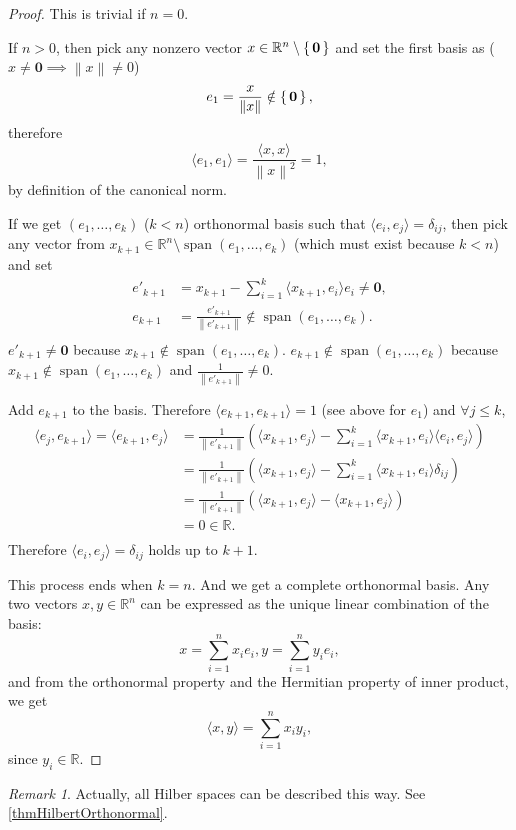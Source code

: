 \documentclass[12pt, letterpaper]{article}
\newcommand{\re}{\mathbb{R}}
\newcommand{\norm}[1]{\left\lVert #1 \right\rVert}
\theoremstyle{definition}
\theoremstyle{remark}
\newtheorem*{rem*}{Remark}
\theoremstyle{definition}
\theoremstyle{plain}
\numberwithin{equation}{section}
\begin{document}
	\begin{proof}
		This is trivial if $n=0$.
		
		If $n>0$, then pick any nonzero vector $x\in\re^n\setminus\set{\boldsymbol{0}}$ and set the first basis
		as ($x\ne\boldsymbol{0}\implies\norm{x}\ne0 $)
		\[e_1=\frac{x}{\norm{x}}\notin\set{\boldsymbol{0}}, \]
		therefore \[\langle e_1,e_1\rangle = \frac{\langle x,x\rangle}{\norm{x}^2}=1,\]
		by definition of the canonical norm.
		
		If we get $(e_1,\dots,e_k)$ ($k<n$)
		orthonormal basis such that $\langle e_i,e_j\rangle=\delta_{ij}$,
		then pick any vector from $x_{k+1}\in\re^n\setminus\operatorname{span}(e_1,\dots,e_k)$
		(which must exist because $k<n$)
		and set
		\[\begin{aligned}
			e'_{k+1}&=x_{k+1}-\sum_{i=1}^{k}\langle x_{k+1},e_i\rangle e_i\ne\boldsymbol{0},\\
			e_{k+1}&=\frac{e'_{k+1}}{\norm{e'_{k+1}}}\notin\operatorname{span}(e_1,\dots,e_k).\\
		\end{aligned}\]
		$e'_{k+1}\ne\boldsymbol{0}$ 
		because $x_{k+1}\notin\operatorname{span}(e_1,\dots,e_k)$.
		$e_{k+1}\notin\operatorname{span}(e_1,\dots,e_k)$
		because $x_{k+1}\notin\operatorname{span}(e_1,\dots,e_k)$ and $\frac{1}{\norm{e'_{k+1}}}
		\ne0$.
		
		Add $e_{k+1}$ to the basis.
		Therefore $\langle e_{k+1},e_{k+1}\rangle=1$ (see above for $e_1$) and
		$\forall j \le k$,
		\[\begin{aligned}
			\langle e_j,e_{k+1}\rangle=\langle e_{k+1},e_{j}\rangle&= \frac{1}{\norm{e'_{k+1}}}\left( \langle
			x_{k+1},e_j\rangle - \sum_{i=1}^{k}\langle x_{k+1},e_i\rangle \langle e_i,e_j\rangle\right)\\
			&=\frac{1}{\norm{e'_{k+1}}}\left( \langle
			x_{k+1},e_j\rangle - \sum_{i=1}^{k}\langle x_{k+1},e_i\rangle \delta_{ij}\right)\\
			&=\frac{1}{\norm{e'_{k+1}}}\left( \langle
			x_{k+1},e_j\rangle - \langle x_{k+1},e_j\rangle \right)\\
			&=0\in \re.\\
		\end{aligned} \]
		Therefore  $\langle e_i,e_j\rangle=\delta_{ij}$ holds up to $k+1$.
		
		This process ends when $k=n$. And we get a complete orthonormal basis.
		Any two vectors $x,y\in\re^n$ can be expressed as the unique linear combination of the basis:
		\[x=\sum_{i=1}^{n}x_ie_i,y=\sum_{i=1}^{n}y_ie_i, \]
		and from the orthonormal property and the Hermitian property of inner product, we get
		\[\langle x,y\rangle = \sum_{i=1}^n x_iy_i,\]
		since $y_i\in \re$.
	\end{proof}
	\begin{rem*}
		Actually, all Hilber spaces can be described this way.
		See \ref{thmHilbertOrthonormal}.
	\end{rem*}
\end{document}
